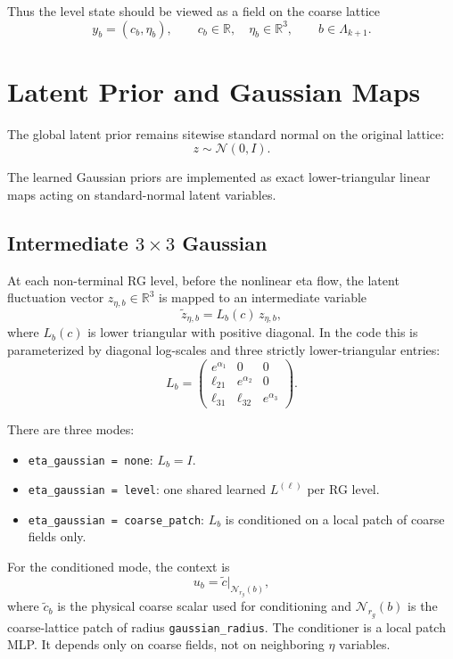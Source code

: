 \documentclass[11pt]{article}
\begin{document}
Thus the level state should be viewed as a field on the coarse lattice
\[
y_b = (c_b,\eta_b), \qquad c_b \in \mathbb{R}, \quad \eta_b \in \mathbb{R}^3,
\qquad b \in \Lambda_{k+1}.
\]

\section{Latent Prior and Gaussian Maps}

The global latent prior remains sitewise standard normal on the original
lattice:
\[
z \sim \mathcal{N}(0, I).
\]

The learned Gaussian priors are implemented as exact lower-triangular linear
maps acting on standard-normal latent variables.

\subsection{Intermediate $3 \times 3$ Gaussian}

At each non-terminal RG level, before the nonlinear eta flow, the latent
fluctuation vector $z_{\eta,b} \in \mathbb{R}^3$ is mapped to an intermediate
variable
\[
\tilde z_{\eta,b} = L_b(c)\, z_{\eta,b},
\]
where $L_b(c)$ is lower triangular with positive diagonal. In the code this is
parameterized by diagonal log-scales and three strictly lower-triangular
entries:
\[
L_b =
\begin{pmatrix}
e^{\alpha_1} & 0 & 0 \\
\ell_{21} & e^{\alpha_2} & 0 \\
\ell_{31} & \ell_{32} & e^{\alpha_3}
\end{pmatrix}.
\]

There are three modes:
\begin{itemize}
\item \texttt{eta\_gaussian = none}: $L_b = I$.
\item \texttt{eta\_gaussian = level}: one shared learned $L^{(\ell)}$ per RG
level.
\item \texttt{eta\_gaussian = coarse\_patch}: $L_b$ is conditioned on a local
patch of coarse fields only.
\end{itemize}

For the conditioned mode, the context is
\[
u_b = \tilde c|_{\mathcal N_{r_g}(b)},
\]
where $\tilde c_b$ is the physical coarse scalar used for conditioning and
$\mathcal N_{r_g}(b)$ is the coarse-lattice patch of radius
\texttt{gaussian\_radius}. The conditioner is a local patch MLP. It depends
only on coarse fields, not on neighboring $\eta$ variables.
\end{document}

